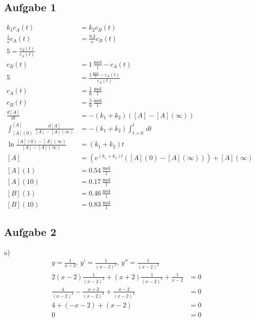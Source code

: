 \documentclass{article}
\begin{document}
\subsection*{Aufgabe 1}
\begin{align*}
    k_1c_A(t) &= k_2c_B(t)\\
    \frac{1}{\mathrm{s}}c_A(t)&=\frac{0.2}{\mathrm{s}}c_B(t)\\
    5 = \frac{c_B(t)}{c_A(t)}\\
    c_B(t) &= 1\,\mathrm{\frac{mol}{l}} - c_A(t)\\
    5 &= \frac{1\,\mathrm{\frac{mol}{l}} - c_A(t)}{c_A(t)}\\
    c_A(t) &= \frac{1}{6}\,\mathrm{\frac{mol}{l}}\\
    c_B(t) &= \frac{5}{6}\,\mathrm{\frac{mol}{l}}\\
    \frac{d[A]}{dt} &= -(k_1 + k_2)([A]-[A](\infty))\\
    \int_{[A](0)}^{[A]} \frac{d[A]}{[A]-[A](\infty)} &= -(k_1+k_2) \int_{t=0}^{t} \,dt\\
    \ln \frac{[A](0)-[A](\infty)}{[A]-[A](\infty)} &= (k_1+k_2)t\\
    [A] &= \left(e^{(k_1+k_2)t}\left([A](0)-[A](\infty)\right)\right) + [A](\infty)\\
    [A](1) &= 0.54\,\mathrm{\frac{mol}{l}}\\
    [A](10) &= 0.17\,\mathrm{\frac{mol}{l}}\\
    [B](1) &= 0.46\,\mathrm{\frac{mol}{l}}\\
    [B](10) &= 0.83\,\mathrm{\frac{mol}{l}}
\end{align*}
\subsection*{Aufgabe 2}
a)
\begin{align*}
    y = \frac{1}{x-2},\,y'= \frac{1}{(x-2)^2},\, y''=\frac{1}{(x-2)^3}\\
    2(x-2)\frac{1}{(x-2)^3}+(x+2)\frac{1}{(x-2)^2}+\frac{1}{x-2} &= 0\\
    \frac{4}{(x-2)^2}-\frac{x+2}{(x-2)^2}+\frac{x-2}{(x-2)^2} &= 0\\
    4+(-x-2)+(x-2) &= 0\\
    0 &= 0\\
\end{align*}
\end{document}
